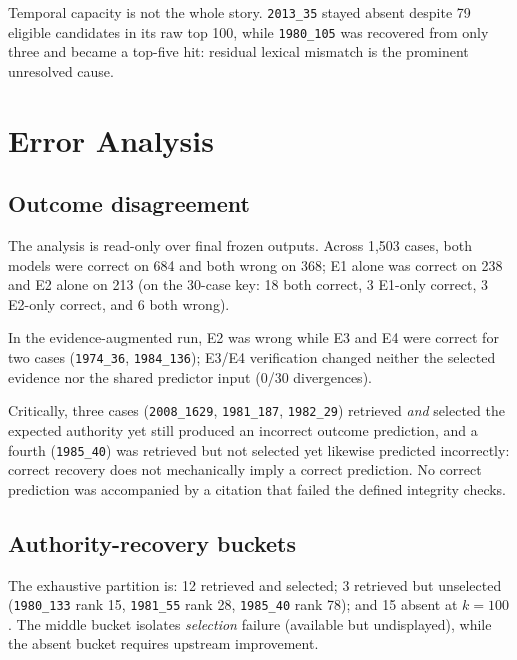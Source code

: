 \documentclass[conference]{IEEEtran}
\begin{document}
Temporal capacity is not the whole story. \texttt{2013\_35} stayed absent
despite 79 eligible candidates in its raw top 100, while
\texttt{1980\_105} was recovered from only three and
became a top-five hit: residual lexical mismatch is the prominent unresolved
cause.

\section{Error Analysis}
\label{sec:error}

\subsection{Outcome disagreement}

The analysis is read-only over final frozen outputs. Across 1{,}503 cases, both models were correct on 684
and both wrong on 368; E1 alone was correct on 238 and E2 alone on 213
(on the 30-case key: 18 both correct, 3 E1-only correct, 3 E2-only correct, and 6 both wrong).


In the evidence-augmented run, E2 was wrong while E3 and E4 were correct for two
cases (\texttt{1974\_36}, \texttt{1984\_136}); E3/E4 verification changed
neither the selected evidence nor the shared predictor input (0/30 divergences).

Critically, three cases (\texttt{2008\_1629}, \texttt{1981\_187},
\texttt{1982\_29}) retrieved \emph{and} selected the expected
authority yet still produced an incorrect outcome prediction, and a fourth
(\texttt{1985\_40}) was retrieved but not selected yet likewise predicted
incorrectly: correct recovery does not mechanically imply a correct prediction. No correct prediction was
accompanied by a citation that failed the defined integrity checks.

\subsection{Authority-recovery buckets}

The exhaustive partition is: 12 retrieved and
selected; 3 retrieved but unselected
(\texttt{1980\_133} rank 15, \texttt{1981\_55} rank 28,
\texttt{1985\_40} rank 78); and 15 absent at $k{=}100$.
The middle bucket isolates \emph{selection} failure (available but undisplayed), while the absent bucket requires upstream
improvement.


\end{document}

